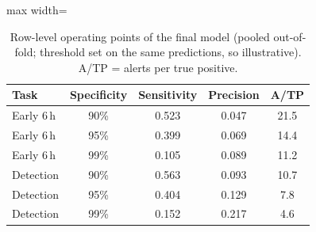 \begin{table}[!t]
\centering\scriptsize
\caption{Row-level operating points of the final model (pooled out-of-fold; threshold set on the same predictions, so illustrative). A/TP = alerts per true positive.}
\label{tab:operating}
\begin{adjustbox}{max width=\linewidth}
\begin{tabular}{lcccc}
\toprule
Task & Specificity & Sensitivity & Precision & A/TP \\
\midrule
Early 6\,h & 90\% & 0.523 & 0.047 & 21.5 \\
Early 6\,h & 95\% & 0.399 & 0.069 & 14.4 \\
Early 6\,h & 99\% & 0.105 & 0.089 & 11.2 \\
\midrule
Detection & 90\% & 0.563 & 0.093 & 10.7 \\
Detection & 95\% & 0.404 & 0.129 & 7.8 \\
Detection & 99\% & 0.152 & 0.217 & 4.6 \\
\bottomrule
\end{tabular}
\end{adjustbox}
\end{table}
